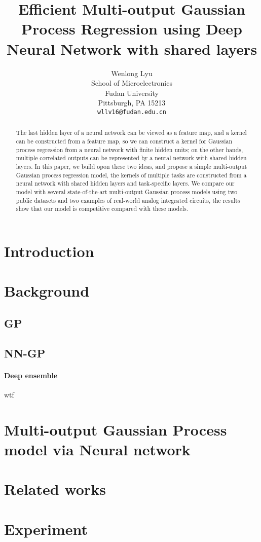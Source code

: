 \documentclass{article}
\title{Efficient Multi-output Gaussian Process Regression using Deep Neural Network with shared layers}
\author{
  Wenlong Lyu \\
  School of Microelectronics\\
  Fudan University\\
  Pittsburgh, PA 15213 \\
  \texttt{wllv16@fudan.edu.cn} \\
}
\begin{document}

\maketitle

\begin{abstract} 
    The last hidden layer of a neural network can be viewed as a feature map,
    and a kernel can be constructed from a feature map, so we can construct a
    kernel for Gaussian process regression from a neural network with finite
    hidden units; on the other hands, multiple correlated outputs can be
    represented by a neural network with shared hidden layers. In this paper,
    we build opon these two ideas, and propose a simple multi-output Gaussian
    process regression model, the kernels of multiple tasks are constructed
    from a neural network with shared hidden layers and task-specific layers.
    We compare our model with several state-of-the-art multi-output Gaussian
    process models using two public datasets and two examples of real-world
    analog integrated circuits, the results show that our model is competitive
    compared with these models.
\end{abstract}

\section{Introduction}

\section{Background}

\subsection{GP}

\subsection{NN-GP}

\paragraph{Deep ensemble} wtf

\section{Multi-output Gaussian Process model via Neural network}

\section{Related works}


\section{Experiment}



\end{document}
